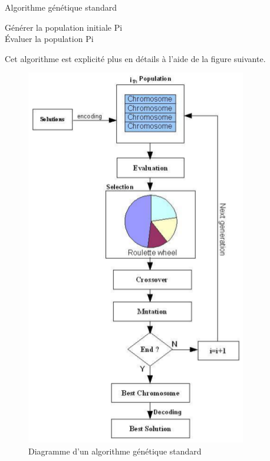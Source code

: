 \documentclass[12pt,a4paper]{article}
\begin{document}
	\begin{algorithm}[H]
 	\caption{Algorithme génétique standard}
 	Générer la population initiale Pi \\
 	Évaluer la population Pi \\
	\end{algorithm}
	
	\vspace*{1cm}
	Cet algorithme est explicité plus en détails à l'aide de la figure suivante.
	
	\begin{figure}[!h]
		\begin{center}
			\includegraphics[scale=.5]{img/genetic_algo_flowchart.png}
			\caption{Diagramme d'un algorithme génétique standard}
		\end{center}
	\end{figure}
	
\end{document}
